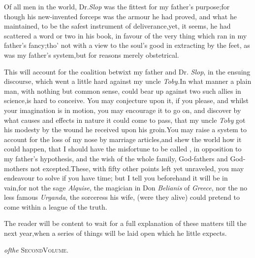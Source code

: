 \documentclass{article}
\begin{document}
Of all men in the world, Dr.\@ \textit{Slop} was the fittest for my
father’s purpose;\tsh for though his new-invented
forceps was the armour he had proved, and what he maintained, to be
the safest instrument of deliverance,\tsk yet, it seems, he had
scattered a word or two in his book, in favour of the very thing
which ran in my father’s fancy;\tsh tho’ not
with a view to the soul’s good in extracting by the feet, as
was my father’s system,\tsk but for reasons merely
obstetrical.

This will account for the coalition betwixt my father and Dr.\@
\textit{Slop}, in the ensuing discourse, which went a little
hard against my uncle \textit{Toby.}\tsk In what manner a plain
man, with nothing but common sense, could bear up against two
such allies in science,\tsk is hard to conceive.\tsk\break
You may conjecture upon it, if you please,\break
\tsk and whilst your imagination is in motion, you may encourage
it to go on, and discover by what causes and effects in nature
it could come to pass, that my uncle \textit{Toby} got his
modesty by the wound he received upon his groin.\tsk You may
raise a system to account for the loss of my nose by
marriage articles,\tsk and shew the world how it could happen,
that I should have the misfortune to be called
, in opposition to my father’s
hypothesis, and the wish of the whole family, God-fathers and
God-mothers not excepted.\tsk These, with fifty other points left
yet unraveled, you may endeavour to solve if you have time;\tsh
but I tell you beforehand it will be in vain,\break\tsk for not the sage
\textit{Alquise}, the magician in Don \textit{Belianis} of
\textit{Greece}, nor the no less famous \textit{Urganda}, the
sorceress his wife, (were they alive) could pretend to come
within a league of the truth.

The reader will be content to wait for a full explanation of
these matters till the next year,\tsk when a series of
things will be laid open which he little expects.

\bigskip
\bigskip
\centerline{\textit{\enspace of\enspace the}\enspace
\textsc{Second\enspace Volume}.}
\end{document}
